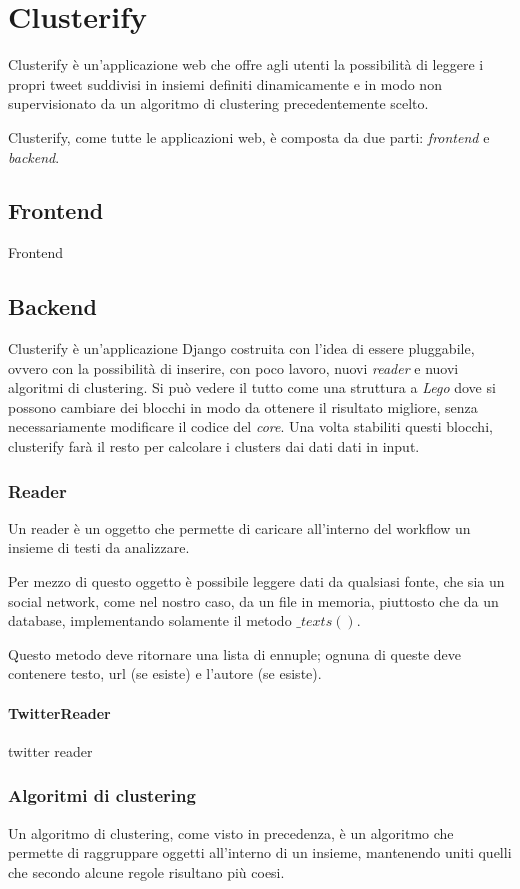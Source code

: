 \chapter{Clusterify}
	Clusterify è un'applicazione web che offre agli utenti la possibilità di leggere i propri tweet suddivisi in insiemi definiti dinamicamente e in modo non supervisionato da un algoritmo di clustering precedentemente scelto.

	Clusterify, come tutte le applicazioni web, è composta da due parti: \emph{frontend} e \emph{backend}.

\section{Frontend}
	Frontend

\section{Backend}
	Clusterify è un'applicazione Django\cite{django_project} costruita con l'idea di essere pluggabile, ovvero con la possibilità di inserire, con poco lavoro, nuovi \emph{reader} e nuovi algoritmi di clustering. Si può vedere il tutto come una struttura a \emph{Lego} dove si possono cambiare dei blocchi in modo da ottenere il risultato migliore, senza necessariamente modificare il codice del \emph{core}. Una volta stabiliti questi blocchi, clusterify farà il resto per calcolare i clusters dai dati dati in input.

	\subsection{Reader}
		Un reader è un oggetto che permette di caricare all'interno del workflow un insieme di testi da analizzare.

		Per mezzo di questo oggetto è possibile leggere dati da qualsiasi fonte, che sia un social network, come nel nostro caso, da un file in memoria, piuttosto che da un database, implementando solamente il metodo $\_texts()$.

		Questo metodo deve ritornare una lista di ennuple; ognuna di queste deve contenere testo, url (se esiste) e l'autore (se esiste).

		\subsubsection{TwitterReader}
			twitter reader

	\subsection{Algoritmi di clustering}
		Un algoritmo di clustering, come visto in precedenza, è un algoritmo che permette di raggruppare oggetti all'interno di un insieme, mantenendo uniti quelli che secondo alcune regole risultano più coesi.

